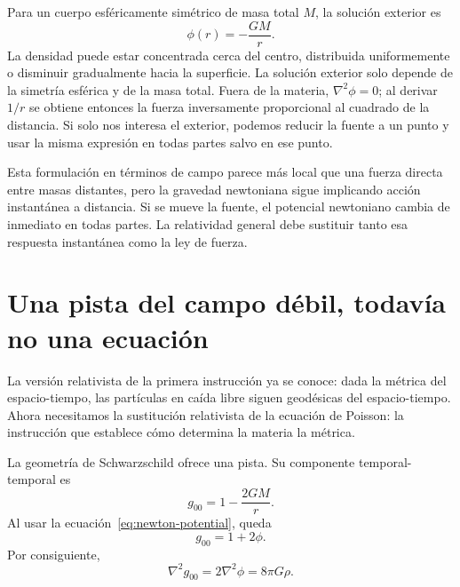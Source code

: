 Para un cuerpo esféricamente simétrico de masa total \(M\), la solución exterior es
\begin{equation}
 \phi(r)=-\frac{GM}{r}.
 \label{eq:newton-potential}
\end{equation}
La densidad puede estar concentrada cerca del centro, distribuida uniformemente o disminuir gradualmente hacia la superficie. La solución exterior solo depende de la simetría esférica y de la masa total. Fuera de la materia,
\(\nabla^2\phi=0\); al derivar \(1/r\) se obtiene entonces la fuerza inversamente proporcional al cuadrado de la distancia. Si solo nos interesa el exterior, podemos reducir la fuente a un punto y usar la misma expresión en todas partes salvo en ese punto.

\begin{classroomqa}
\end{classroomqa}

Esta formulación en términos de campo parece más local que una fuerza directa entre masas distantes, pero la gravedad newtoniana sigue implicando acción instantánea a distancia. Si se mueve la fuente, el potencial newtoniano cambia de inmediato en todas partes. La relatividad general debe sustituir tanto esa respuesta instantánea como la ley de fuerza.

\section{Una pista del campo débil, todavía no una ecuación}

La versión relativista de la primera instrucción ya se conoce: dada la métrica del espacio-tiempo, las partículas en caída libre siguen geodésicas del espacio-tiempo. Ahora necesitamos la sustitución relativista de la ecuación de Poisson: la instrucción que establece cómo determina la materia la métrica.

La geometría de Schwarzschild ofrece una pista. Su componente temporal-temporal es
\begin{equation}
 g_{00}=1-\frac{2GM}{r}.
\end{equation}
Al usar la ecuación~\eqref{eq:newton-potential}, queda
\begin{equation}
 g_{00}=1+2\phi.
\end{equation}
Por consiguiente,
\begin{equation}
 \nabla^2g_{00}=2\nabla^2\phi=8\pi G\rho.
 \label{eq:weak-mnemonic}
\end{equation}

